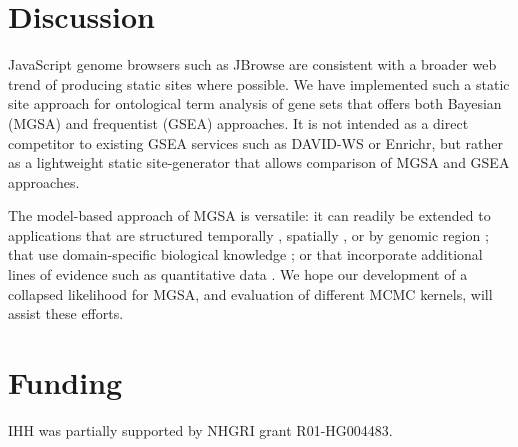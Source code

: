 \section*{Discussion}

JavaScript genome browsers such as JBrowse \citep{pmid27072794}
are consistent with a broader web trend of producing static sites where possible.
We have implemented such a static site approach for ontological term analysis of gene sets that offers both Bayesian (MGSA) and frequentist (GSEA) approaches.
It is not intended as a direct competitor to existing GSEA services such as DAVID-WS or Enrichr,
but rather as a lightweight static site-generator that allows comparison of MGSA and GSEA approaches.

The model-based approach of MGSA is versatile: it can readily be extended
to applications that are structured
temporally \citep{pmid26111374},
spatially \citep{pmid26877824},
or by genomic region \citep{pmid20436461};
that use domain-specific biological knowledge \citep{pmid24675718};
or that incorporate additional lines of evidence such as quantitative data \citep{pmid21599902}.
We hope our development of a collapsed likelihood for MGSA, and evaluation of different MCMC kernels, will assist these efforts.

\section*{Funding}

IHH was partially supported by NHGRI grant R01-HG004483.


%
%
%
%
%
%
%
%



